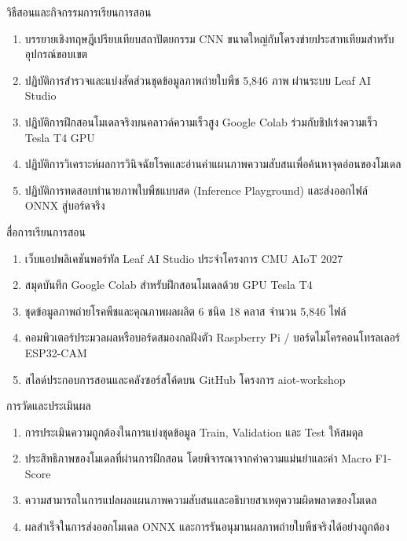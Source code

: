 \newpage

\begin{planbox}{วิธีสอนและกิจกรรมการเรียนการสอน}
\begin{enumerate}[topsep=2pt, itemsep=1pt, partopsep=0pt, parsep=0pt, leftmargin=1.5em]
    \item บรรยายเชิงทฤษฎีเปรียบเทียบสถาปัตยกรรม CNN ขนาดใหญ่กับโครงข่ายประสาทเทียมสำหรับอุปกรณ์ขอบเขต
    \item ปฏิบัติการสำรวจและแบ่งสัดส่วนชุดข้อมูลภาพถ่ายใบพืช 5,846 ภาพ ผ่านระบบ Leaf AI Studio
    \item ปฏิบัติการฝึกสอนโมเดลจริงบนคลาวด์ความเร็วสูง Google Colab ร่วมกับชิปเร่งความเร็ว Tesla T4 GPU
    \item ปฏิบัติการวิเคราะห์ผลการวินิจฉัยโรคและอ่านค่าแผนภาพความสับสนเพื่อค้นหาจุดอ่อนของโมเดล
    \item ปฏิบัติการทดสอบทำนายภาพใบพืชแบบสด (Inference Playground) และส่งออกไฟล์ ONNX สู่บอร์ดจริง
\end{enumerate}
\end{planbox}

\begin{planbox}{สื่อการเรียนการสอน}
\begin{enumerate}[topsep=2pt, itemsep=1pt, partopsep=0pt, parsep=0pt, leftmargin=1.5em]
    \item เว็บแอปพลิเคชันพอร์ทัล Leaf AI Studio ประจำโครงการ CMU AIoT 2027
    \item สมุดบันทึก Google Colab สำหรับฝึกสอนโมเดลด้วย GPU Tesla T4
    \item ชุดข้อมูลภาพถ่ายโรคพืชและคุณภาพผลผลิต 6 ชนิด 18 คลาส จำนวน 5,846 ไฟล์
    \item คอมพิวเตอร์ประมวลผลหรือบอร์ดสมองกลฝังตัว Raspberry Pi / บอร์ดไมโครคอนโทรลเลอร์ ESP32-CAM
    \item สไลด์ประกอบการสอนและคลังซอร์สโค้ดบน GitHub โครงการ aiot-workshop
\end{enumerate}
\end{planbox}

\begin{planbox}{การวัดและประเมินผล}
\begin{enumerate}[topsep=2pt, itemsep=1pt, partopsep=0pt, parsep=0pt, leftmargin=1.5em]
    \item การประเมินความถูกต้องในการแบ่งชุดข้อมูล Train, Validation และ Test ให้สมดุล
    \item ประสิทธิภาพของโมเดลที่ผ่านการฝึกสอน โดยพิจารณาจากค่าความแม่นยำและค่า Macro F1-Score
    \item ความสามารถในการแปลผลแผนภาพความสับสนและอธิบายสาเหตุความผิดพลาดของโมเดล
    \item ผลสำเร็จในการส่งออกโมเดล ONNX และการรันอนุมานผลภาพถ่ายใบพืชจริงได้อย่างถูกต้อง
\end{enumerate}
\end{planbox}

